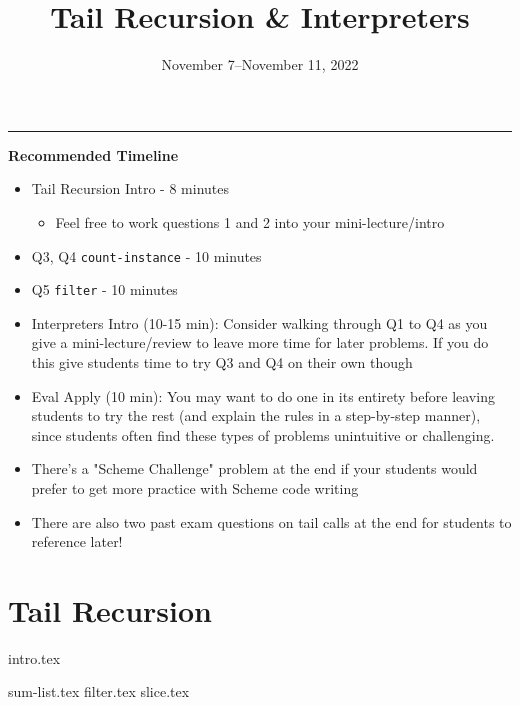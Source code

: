 \documentclass{exam}
\title{Tail Recursion \& Interpreters}
\date{November 7--November 11, 2022}
\begin{document}
\maketitle
\rule{\textwidth}{0.15em}
\fontsize{12}{15}\selectfont

\begin{guide}
\begin{blocksection}
    \textbf{Recommended Timeline}
    \begin{itemize}
        \item Tail Recursion Intro - 8 minutes
        \begin{itemize}
            \item Feel free to work questions 1 and 2 into your mini-lecture/intro
        \end{itemize}
        \item Q3, Q4 \lstinline{count-instance} - 10 minutes
        \item Q5 \lstinline{filter} - 10 minutes
        \item Interpreters Intro (10-15 min): Consider walking through Q1 to Q4 as 
        you give a mini-lecture/review to leave more time for later problems. If you do this give students time to try 
        Q3 and Q4 on their own though
        \item Eval Apply (10 min): You may want to do one in its entirety before leaving students to try the rest
        (and explain the rules in a step-by-step manner), since students often find these types of problems unintuitive or challenging.
        \item There's a "Scheme Challenge" problem at the end if your students would prefer to get more practice with Scheme code writing
        \item There are also two past exam questions on tail calls at the end for students to reference later!
    \end{itemize}
\end{blocksection}
\newpage
\end{guide}

\section{Tail Recursion}
{intro.tex}
\newpage
\begin{questions}
    {sum-list.tex}
    {filter.tex}
    \newpage
    {slice.tex}
\end{questions}
\end{document}
